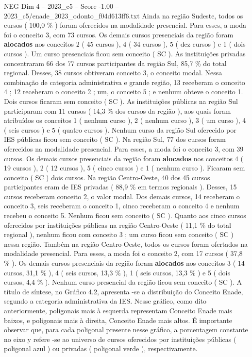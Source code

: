 \begin{textsample}{NEG Dim 4 – 2023\_c5 – Score -1.00 – 2023\_c5/enade\_2023\_odonto\_f04d613ff6.txt}
Ainda na região Sudeste, todos os cursos ( 100,0 \% ) foram oferecidos na modalidade presencial.
Para esses, a moda foi o conceito 3, com 73 cursos.
Os demais cursos presenciais da região foram \textbf{alocados} nos conceitos 2 ( 45 cursos ), 4 ( 34 cursos ), 5 ( dez cursos ) e 1 ( dois cursos ).
Um curso presenciais ficou sem conceito ( SC ).
As instituições privadas concentraram 66 dos 77 cursos participantes da região Sul, 85,7 \% do total regional.
Desses, 38 cursos obtiveram conceito 3, o conceito modal.
Nessa combinação de categoria administrativa e grande região, 13 receberam o conceito 4 ; 12 receberam o conceito 2 ; um, o conceito 5 ; e nenhum obteve o conceito 1.
Dois cursos ficaram sem conceito ( SC ).
As instituições públicas na região Sul participaram com 11 cursos ( 14,3 \% dos cursos da região ), aos quais foram atribuídos os conceitos 1 ( nenhum curso ), 2 ( nenhum curso ), 3 ( um curso ), 4 ( seis cursos ) e 5 ( quatro cursos ).
Nenhum curso da região Sul oferecido por IES públicas ficou sem conceito ( SC ).
Na região Sul, 77 dos cursos foram oferecidos na modalidade presencial.
Para esses, a moda foi o conceito 3, com 39 cursos.
Os demais cursos presenciais da região foram \textbf{alocados} nos conceitos 4 ( 19 cursos ), 2 ( 12 cursos ), 5 ( cinco cursos ) e 1 ( nenhum curso ).
Ficaram sem conceito ( SC ) dois cursos.
Na região Centro-Oeste, 40 dos 45 cursos participantes eram de IES privadas ( 88,9 \% em termos regionais ).
Desses, 15 cursos receberam conceito 2, o valor modal.
Dos demais cursos, 14 receberam o conceito 3, seis receberam o conceito 1, cinco receberam o conceito 4 e nenhum recebeu o conceito 5.
Nenhum ficou sem conceito ( SC ).
Quanto aos cinco cursos oferecidos por instituições públicas na região Centro-Oeste ( 11,1 \% do total regional ), nenhum ficou com conceito 3 ; um curso ficou sem conceito ( SC ) nessa região.
Também na região Centro-Oeste, todos os cursos foram ofertados na modalidade presencial.
Para esses, a moda foi o conceito 2, com 17 cursos ( 37,8 \% ).
Os demais cursos presenciais da região foram \textbf{alocados} nos conceitos 3 ( 14 cursos, 31,1 \% ), 4 ( seis cursos, 13,3 \% ), 1 ( seis cursos, 13,3 \% ) e 5 ( dois cursos, 4,4 \% ).
Nenhum curso presencial da região ficou sem conceito ( SC ).
A título de síntese, no Gráfico 4.2, apresenta -se a distribuição do Conceito Enade, segundo a categoria administrativa da IES.
Nesse gráfico, como dito anteriormente, poligonais mais à esquerda representam Conceito Enade mais baixos, e poligonais mais à direita, Conceito Enade mais altos.
É importante observar que, para cada poligonal presente nesse gráfico, a porcentagem constante no eixo y refere -se ao universo de cursos oferecidos por instituições públicas ( poligonal azul ) ou privadas ( poligonal verde ), respectivamente.

\end{textsample}
